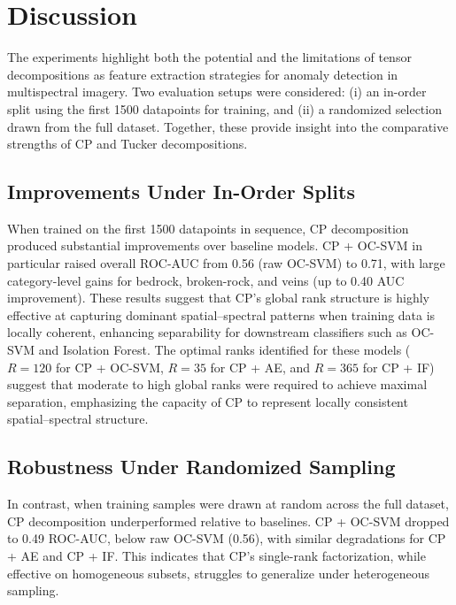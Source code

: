 \documentclass[pdflatex,sn-mathphys-ay]{sn-jnl}
\begin{document}
\section{Discussion}

The experiments highlight both the potential and the limitations of tensor decompositions as feature extraction strategies for anomaly detection in multispectral imagery. Two evaluation setups were considered: (i) an in-order split using the first 1500 datapoints for training, and (ii) a randomized selection drawn from the full dataset. Together, these provide insight into the comparative strengths of CP and Tucker decompositions.  

\subsection{Improvements Under In-Order Splits}

When trained on the first 1500 datapoints in sequence, CP decomposition produced substantial improvements over baseline models. CP + OC-SVM in particular raised overall ROC-AUC from 0.56 (raw OC-SVM) to 0.71, with large category-level gains for bedrock, broken-rock, and veins (up to 0.40 AUC improvement). These results suggest that CP’s global rank structure is highly effective at capturing dominant spatial–spectral patterns when training data is locally coherent, enhancing separability for downstream classifiers such as OC-SVM and Isolation Forest. The optimal ranks identified for these models (\(R=120\) for CP + OC-SVM, \(R=35\) for CP + AE, and \(R=365\) for CP + IF) suggest that moderate to high global ranks were required to achieve maximal separation, emphasizing the capacity of CP to represent locally consistent spatial–spectral structure.  

\subsection{Robustness Under Randomized Sampling}

In contrast, when training samples were drawn at random across the full dataset, CP decomposition underperformed relative to baselines. CP + OC-SVM dropped to 0.49 ROC-AUC, below raw OC-SVM (0.56), with similar degradations for CP + AE and CP + IF. This indicates that CP’s single-rank factorization, while effective on homogeneous subsets, struggles to generalize under heterogeneous sampling.  
\end{document}
